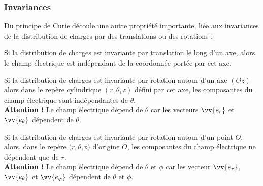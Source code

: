 \documentclass[11pt,fleqn]{book} %
\begin{document}
%

\subsubsection{Invariances}

Du principe de Curie découle une autre propriété importante, liée aux invariances de la distribution de charges par des translations ou des rotations :

\begin{proposition}
    Si la distribution de charges est invariante par translation le long d'un axe, alors le champ électrique est indépendant de la coordonnée portée par cet axe.
\end{proposition}

\begin{proposition}
    Si la distribution de charges est invariante par rotation autour d'un axe $(Oz)$ alors dans le repère cylindrique $(r,\theta,z)$ défini par cet axe, les composantes du champ électrique sont indépendantes de $\theta$.\\
    \textbf{Attention !} Le champ électrique dépend de $\theta$  car les vecteurs $\vv{e_r}$ et $\vv{e_\theta}$ dépendent de $\theta$.
\end{proposition}


\begin{proposition}
    Si la distribution de charges est invariante par rotation autour d'un point $O$, alors, dans le repère $(r,\theta$,$\phi)$ d'origine $O$, les composantes du champ électrique ne dépendent que de $r$. \\
    \textbf{Attention !} Le champ électrique dépend de $\theta$ et $\phi$ car les vecteur $\vv{e_r}$, $\vv{e_\theta}$ et $\vv{e_\varphi}$ dépendent de $\theta$ et $\phi$.
\end{proposition}
\end{document}
